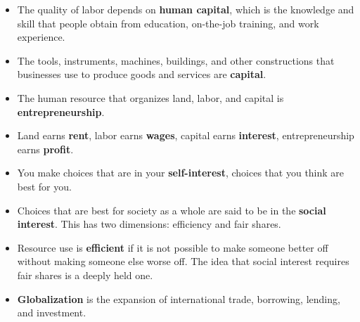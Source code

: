 \documentclass{article}
\begin{document}
\begin{description}
\begin{itemize}
        \item The quality of labor depends on \textbf{human capital}, which is the knowledge and skill that people obtain from education, on-the-job training, and work experience.
        \item The tools, instruments, machines, buildings, and other constructions that businesses use to produce goods and services are \textbf{capital}.
        \item The human resource that organizes land, labor, and capital is \textbf{entrepreneurship}.
        \item Land earns \textbf{rent}, labor earns \textbf{wages}, capital earns \textbf{interest}, entrepreneurship earns \textbf{profit}.
        \item You make choices that are in your \textbf{self-interest}, choices that you think are  best for you.
        \item Choices that are best for society as a whole are said to be in the \textbf{social interest}. This has two dimensions: efficiency and fair shares.
        \item Resource use is \textbf{efficient} if it is not possible to make someone better off without making someone else worse off. The idea that social interest requires fair shares is a deeply held one.
        \item \textbf{Globalization} is the expansion of international trade, borrowing, lending, and investment.
    \end{itemize}
\end{description}
\end{document}
